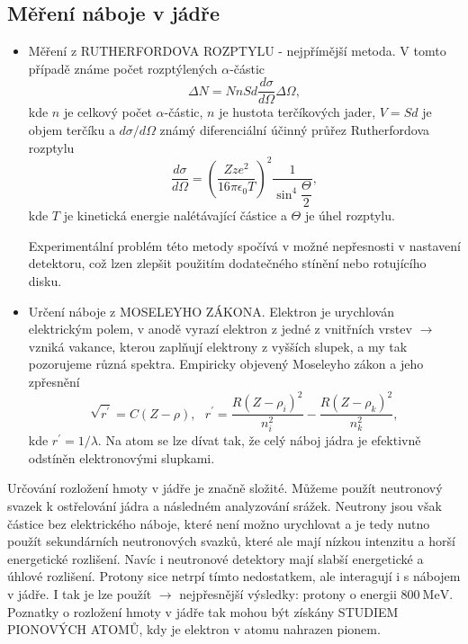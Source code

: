 \documentclass[../../main.tex]{subfiles}
\begin{document}
\subsection{Měření náboje v jádře}

\begin{itemize}
	\item Měření z RUTHERFORDOVA ROZPTYLU - nejpřímější metoda. V tomto případě známe počet rozptýlených $\alpha$-částic
	\begin{equation}
	\Delta N = N n S d \dfrac{d \sigma}{d \Omega} \Delta \Omega,
	\end{equation}
	kde $n$ je celkový počet $\alpha$-částic, $n$ je hustota terčíkových jader, $V = Sd$ je objem terčíku a $d \sigma / d \Omega$ známý diferenciální účinný průřez Rutherfordova rozptylu
	\begin{equation}
	\dfrac{d \sigma}{d \Omega} = \left( \dfrac{Z z e^2}{16 \pi \epsilon _0 T}\right) ^2 \dfrac{1}{\sin^4 \dfrac{\Theta}{2}} ,
	\end{equation}
	kde $T$ je kinetická energie nalétávající částice a $\Theta$ je úhel rozptylu.
	
	Experimentální problém této metody spočívá v možné nepřesnosti v nastavení detektoru, což lzen zlepšit použitím dodatečného stínění nebo rotujícího disku.
	
	\item Určení náboje z MOSELEYHO ZÁKONA. Elektron je urychlován elektrickým polem, v anodě vyrazí elektron z jedné z vnitřních vrstev $\rightarrow$ vzniká vakance, kterou zaplňují elektrony z vyšších slupek, a my tak pozorujeme různá spektra. Empiricky objevený Moseleyho  zákon a jeho zpřesnění
	\begin{equation}
	\sqrt{r^{'}} = C (Z - \rho), ~~~ r^{'} = \dfrac{R (Z - \rho_i)^2}{n_{i}^2} - \dfrac{R(Z - \rho_k)^2}{n_{k}^2},
	\end{equation}
	kde $r^{'} = 1/ \lambda$. Na atom se lze dívat tak, že celý náboj jádra je efektivně odstíněn elektronovými slupkami. 
\end{itemize}

Určování rozložení hmoty v jádře je značně složité. Můžeme použít neutronový svazek k ostřelování jádra a následném analyzování srážek. Neutrony jsou však částice bez elektrického náboje, které není možno urychlovat a je tedy nutno použít sekundárních neutronových svazků, které ale mají nízkou intenzitu a horší energetické rozlišení. Navíc i neutronové detektory mají slabší energetické a úhlové rozlišení. Protony sice netrpí tímto nedostatkem, ale interagují i s nábojem v jádře. I tak je lze použít $\rightarrow$ nejpřesnější výsledky: protony o energii $800 ~\mathrm{MeV}$. Poznatky o rozložení hmoty v jádře tak mohou být získány STUDIEM PIONOVÝCH ATOMŮ, kdy je elektron v atomu nahrazen pionem. 
\end{document}
